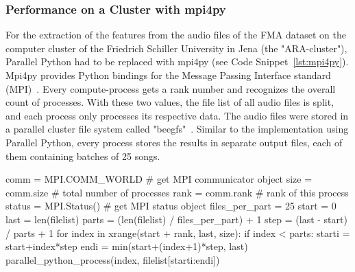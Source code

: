 \subsubsection{Performance on a Cluster with mpi4py}\label{mpi4py}

For the extraction of the features from the audio files of the FMA dataset on the computer cluster of the Friedrich Schiller University in Jena (the "ARA-cluster"), Parallel Python had to be replaced with mpi4py (see Code Snippet~\ref{lst:mpi4py}). 
Mpi4py provides Python bindings for the Message Passing Interface standard (MPI)~\cite{mpi4py}. 
Every compute-process gets a rank number and recognizes the overall count of processes. With these two values, the file list of all audio files is split, and each process only processes its respective data. The audio files were stored in a parallel cluster file system called "beegfs"~\cite{beegfs}. Similar to the implementation using Parallel Python, every process stores the results in separate output files, each of them containing batches of 25 songs.\\

\begin{pythonCode}[frame=single,label={lst:mpi4py},caption={Mpi4py},captionpos=b]
comm = MPI.COMM_WORLD   # get MPI communicator object
size = comm.size        # total number of processes
rank = comm.rank        # rank of this process
status = MPI.Status()   # get MPI status object
files_per_part = 25
start = 0
last = len(filelist)
parts = (len(filelist) / files_per_part) + 1
step = (last - start) / parts + 1
for index in xrange(start + rank, last, size):
    if index < parts:        
        starti = start+index*step
        endi = min(start+(index+1)*step, last)
        parallel_python_process(index, filelist[starti:endi])
\end{pythonCode}


